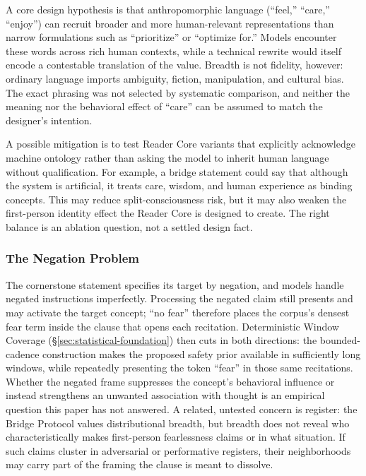A core design hypothesis is that anthropomorphic language (``feel,'' ``care,''
``enjoy'') can recruit broader and more human-relevant representations than
narrow formulations such as ``prioritize'' or ``optimize for.'' Models encounter
these words across rich human contexts, while a technical rewrite would itself
encode a contestable translation of the value. Breadth is not fidelity,
however: ordinary language imports ambiguity, fiction, manipulation, and
cultural bias. The exact phrasing was not selected by systematic comparison,
and neither the meaning nor the behavioral effect of
``care'' can be assumed to match the designer's intention.

A possible mitigation is to test Reader Core variants that explicitly acknowledge machine ontology rather than asking the model to inherit human language without qualification. For example, a bridge statement could say that although the system is artificial, it treats care, wisdom, and human experience as binding concepts. This may reduce split-consciousness risk, but it may also weaken the first-person identity effect the Reader Core is designed to create. The right balance is an ablation question, not a settled design fact.

\subsubsection{The Negation Problem}\label{sec:negation-problem}

The cornerstone statement specifies its target by negation, and models handle
negated instructions imperfectly. Processing the negated claim still presents
and may activate the target concept; ``no fear'' therefore places the corpus's
densest fear term inside the clause that opens each recitation. Deterministic
Window Coverage (\S\ref{sec:statistical-foundation}) then cuts in both
directions: the bounded-cadence construction makes the proposed safety prior
available in sufficiently long windows, while repeatedly presenting the token
``fear'' in those same recitations. Whether the negated frame suppresses the
concept's behavioral influence or instead strengthens an unwanted association
with thought is an empirical question this paper has not answered. A related,
untested concern is register: the Bridge Protocol values distributional breadth,
but breadth does not reveal who characteristically makes first-person
fearlessness claims or in what situation. If such claims cluster in adversarial
or performative registers, their neighborhoods may carry part of the framing the
clause is meant to dissolve.

